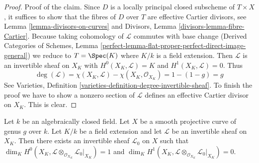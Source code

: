 \begin{proof}
\medskip\noindent
Proof of the claim. Since $D$ is a locally principal closed subscheme
of $T \times X$, it suffices to show that the fibres of $D$ over $T$ are
effective Cartier divisors, see Lemma \ref{lemma-divisors-on-curves} and
Divisors, Lemma \ref{divisors-lemma-fibre-Cartier}. Because taking
cohomology of $\mathcal{L}$ commutes with base change
(Derived Categories of Schemes, Lemma
\ref{perfect-lemma-flat-proper-perfect-direct-image-general})
we reduce to $T = \Spec(K)$ where $K/k$ is a field extension.
Then $\mathcal{L}$ is an invertible sheaf on $X_K$ with
$H^0(X_K, \mathcal{L}) = K$ and $H^1(X_K, \mathcal{L}) = 0$. Thus
$$
\deg(\mathcal{L}) = \chi(X_K, \mathcal{L}) - \chi(X_K, \mathcal{O}_{X_K})
= 1 - (1 - g) = g
$$
See Varieties, Definition \ref{varieties-definition-degree-invertible-sheaf}.
To finish the proof we have to show a nonzero section of $\mathcal{L}$
defines an effective Cartier divisor on $X_K$.
This is clear.
\end{proof}

\begin{lemma}
\label{lemma-twist-with-general-divisor}
Let $k$ be an algebraically closed field. Let $X$ be a smooth projective
curve of genus $g$ over $k$. Let $K/k$ be a field extension and let
$\mathcal{L}$ be an invertible sheaf on $X_K$. Then there exists an
invertible sheaf $\mathcal{L}_0$ on $X$ such that
$\dim_K H^0(X_K,
\mathcal{L} \otimes_{\mathcal{O}_{X_K}} \mathcal{L}_0|_{X_K}) = 1$ and
$\dim_K H^1(X_K,
\mathcal{L} \otimes_{\mathcal{O}_{X_K}} \mathcal{L}_0|_{X_K}) = 0$.
\end{lemma}

